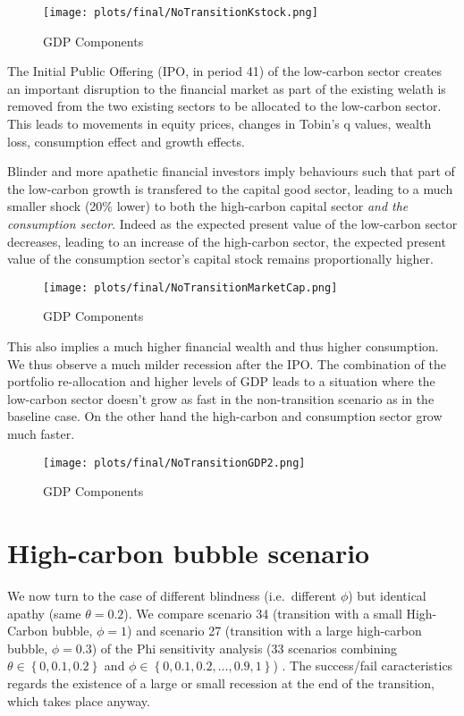 \documentclass[]{article}
\begin{document}
\begin{figure}[htbp]
\centering
\texttt{[image: plots/final/NoTransitionKstock.png]}
\caption{GDP Components}
\end{figure}

The Initial Public Offering (IPO, in period 41) of the low-carbon sector
creates an important disruption to the financial market as part of the
existing welath is removed from the two existing sectors to be allocated
to the low-carbon sector. This leads to movements in equity prices,
changes in Tobin's q values, wealth loss, consumption effect and growth
effects.

Blinder and more apathetic financial investors imply behaviours such
that part of the low-carbon growth is transfered to the capital good
sector, leading to a much smaller shock (20\% lower) to both the
high-carbon capital sector \emph{and the consumption sector}. Indeed as
the expected present value of the low-carbon sector decreases, leading
to an increase of the high-carbon sector, the expected present value of
the consumption sector's capital stock remains proportionally higher.

\begin{figure}[htbp]
\centering
\texttt{[image: plots/final/NoTransitionMarketCap.png]}
\caption{GDP Components}
\end{figure}

This also implies a much higher financial wealth and thus higher
consumption. We thus observe a much milder recession after the IPO. The
combination of the portfolio re-allocation and higher levels of GDP
leads to a situation where the low-carbon sector doesn't grow as fast in
the non-transition scenario as in the baseline case. On the other hand
the high-carbon and consumption sector grow much faster.

\begin{figure}[htbp]
\centering
\texttt{[image: plots/final/NoTransitionGDP2.png]}
\caption{GDP Components}
\end{figure}

\section{High-carbon bubble scenario}\label{high-carbon-bubble-scenario}

We now turn to the case of different blindness (i.e.~different \(\phi\))
but identical apathy (same \(\theta=0.2\)). We compare scenario 34
(transition with a small High-Carbon bubble, \(\phi=1\)) and scenario 27
(transition with a large high-carbon bubble, \(\phi=0.3\)) of the Phi
sensitivity analysis (33 scenarios combining
\(\theta \in \left\{0,0.1,0.2\right\}\) and
\(\phi \in \left\{0,0.1,0.2,...,0.9,1\right\}\)) . The success/fail
caracteristics regards the existence of a large or small recession at
the end of the transition, which takes place anyway.
\end{document}
